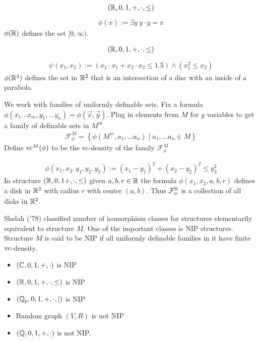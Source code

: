 \documentclass{beamer}
\newcommand{\F}{\mathcal F}
\newcommand{\curly}[1]{\left\{ #1 \right\}}
\begin{document}
\begin{frame}
	\begin{align*}
		(\mathbb{R}, 0, 1, +, \cdot, \leq)
	\end{align*}
	\begin{align*}
		\phi(x) := \exists y \ y \cdot y = x
	\end{align*}
	$\phi(\mathbb{R})$ defines the set $[0, \infty)$.
\end{frame}

\begin{frame}
	\begin{align*}
		(\mathbb{R}, 0, 1, +, \cdot, \leq)
	\end{align*}
	\begin{align*}
		\psi(x_1, x_2) := (x_1 \cdot x_1 + x_2 \cdot x_2 \leq 1.5) \wedge (x_1^2 \leq x_2)
	\end{align*}
	$\phi(\mathbb{R}^2)$ defines the set in $\mathbb{R}^2$ that is an intersection of a disc with an inside of a parabola.
\end{frame}

\begin{frame}
	We work with families of uniformly definable sets.
	Fix a formula $\phi(x_1 \ldots x_m, y_1, \ldots y_n) = \phi(\vec x, \vec y)$.
	Plug in elements from $M$ for $y$ variables to get a family of definable sets in $M^m$.
	\begin{align*}
		\F^M_\phi = \curly{\phi(M^m, a_1, \ldots a_n) \mid a_1, \ldots a_n \in M}
	\end{align*}
	Define $\operatorname{vc}^M(\phi)$ to be the vc-density of the family $\F^M_\phi$ \\
\end{frame}

\begin{frame}
	\begin{align*}
		\phi(x_1, x_2, y_1, y_2, y_3) := (x_1 - y_1)^2 + (x_2 - y_2)^2 \leq y_3^2
	\end{align*}
	In structure $(\mathbb{R}, 0, 1 +, \cdot, \leq)$ given $a,b,r \in \mathbb{R}$ the formula $\phi(x_1, x_2, a, b, r)$ defines a disk in $\mathbb{R}^2$ with radius $r$ with center $(a,b)$.
	Thus $\F^\R_\phi$ is a collection of all disks in $\mathbb{R}^2$.
\end{frame}

\begin{frame}
	Shelah ('78) classified number of isomorphism classes for structures elementarily equivalent to structure $M$.
	One of the important classes is NIP structures.
	Structure $M$ is said to be NIP if all uniformly definable families in it have finite $\operatorname{vc}$-density.
	\begin{itemize}
		\item $(\mathbb{C}, 0, 1, +, \cdot)$ is NIP
		\item $(\mathbb{R}, 0, 1, +, \cdot, \leq)$ is NIP
		\item $(\mathbb{Q}_p, 0, 1, +, \cdot, \mid)$ is NIP
		\item Random graph $(V, R)$ is not NIP
		\item $(\mathbb{Q}, 0, 1, +, \cdot)$ is not NIP.
	\end{itemize}
\end{frame}
\end{document}
